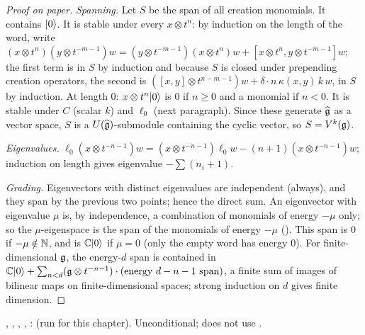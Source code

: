 \begin{proof}[Proof on paper]
\emph{Spanning.} Let $S$ be the span of all creation monomials. It contains $|0\rangle$. It is stable
under every $x\otimes t^n$: by induction on the length of the word, write
$(x\otimes t^n)(y\otimes t^{-m-1})w = (y\otimes t^{-m-1})(x\otimes t^n)w + [x\otimes t^n, y\otimes t^{-m-1}]w$;
the first term is in $S$ by induction and because $S$ is closed under prepending creation operators,
the second is $([x,y]\otimes t^{n-m-1})w + \delta\cdot n\,\kappa(x,y)\,k\,w$, in $S$ by induction. At length
$0$: $x\otimes t^n|0\rangle$ is $0$ if $n\ge0$ and a monomial if $n<0$. It is stable under $C$ (scalar
$k$) and $\ell_0$ (next paragraph). Since these generate $\widehat{\mathfrak{g}}$ as a vector space, $S$ is a
$U(\widehat{\mathfrak{g}})$-submodule containing the cyclic vector, so $S = V^k(\mathfrak{g})$.

\emph{Eigenvalues.} $\ell_0(x\otimes t^{-n-1})w = (x\otimes t^{-n-1})\ell_0w - (n+1)(x\otimes t^{-n-1})w$;
induction on length gives eigenvalue $-\sum(n_i+1)$.

\emph{Grading.} Eigenvectors with distinct eigenvalues are independent (always), and they span by the
previous two points; hence the direct sum. An eigenvector with eigenvalue $\mu$ is, by independence,
a combination of monomials of energy $-\mu$ only; so the $\mu$-eigenspace is the span of the monomials
of energy $-\mu$ (\allowbreak{}). This span is $0$ if $-\mu\notin{\mathbb{N}}$, and is ${\mathbb{C}}|0\rangle$ if
$\mu=0$ (only the empty word has energy $0$). For finite-dimensional $\mathfrak{g}$, the energy-$d$ span is
contained in ${\mathbb{C}}|0\rangle + \sum_{n<d}(\mathfrak{g}\otimes t^{-n-1})\cdot(\text{energy }d-n-1\text{ span})$, a finite
sum of images of bilinear maps on finite-dimensional spaces; strong induction on $d$ gives finite
dimension.
\end{proof}

\begin{status}
\allowbreak{}\allowbreak{}\allowbreak{}\allowbreak{}, \allowbreak{}\allowbreak{}\allowbreak{},
\allowbreak{}\allowbreak{}\allowbreak{}\allowbreak{}\allowbreak{}\allowbreak{}\allowbreak{}, \allowbreak{}\allowbreak{}\allowbreak{}\allowbreak{},
\allowbreak{}\allowbreak{}\allowbreak{}: 
(run for this chapter). Unconditional; does not use .
\end{status}


